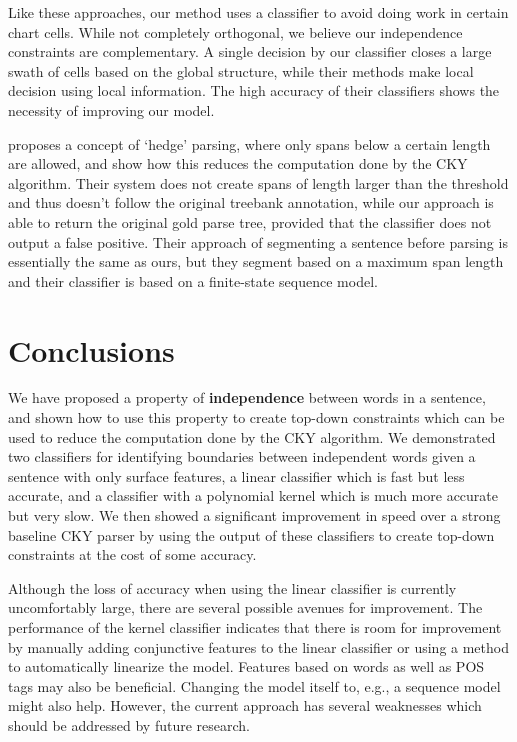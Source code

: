 \documentclass[11pt]{article}
\begin{document}
Like these approaches, our method uses a classifier to avoid doing
work in certain chart cells. While not completely orthogonal, we
believe our independence constraints are complementary. A single
decision by our classifier closes a large swath of cells based on the
global structure, while their methods make local decision using local
information. The high accuracy of their classifiers shows the necessity
of improving our model.

\cite{Yarmohammadi2014} proposes a concept of `hedge' parsing, where only spans
below a certain length are allowed, and show how this reduces the computation
done by the CKY algorithm. Their system does not create spans of length larger
than the threshold and thus doesn't follow the original treebank annotation,
while our approach is able to return the original gold parse tree, provided that
the classifier does not output a false positive. Their approach of segmenting a
sentence before parsing is essentially the same as ours, but they segment based
on a maximum span length and their classifier is based on a finite-state
sequence model.

\section{Conclusions}
\label{sec-7}

We have proposed a property of \textbf{independence} between words in a sentence, and
shown how to use this property to create top-down constraints which can be used
to reduce the computation done by the CKY algorithm. We demonstrated two
classifiers for identifying boundaries between independent words given a
sentence with only surface features, a linear classifier which is fast but less
accurate, and a classifier with a polynomial kernel which is much more accurate
but very slow. We then showed a significant improvement in speed over a strong
baseline CKY parser by using the output of these classifiers to create top-down
constraints at the cost of some accuracy.

Although the loss of accuracy when using the linear classifier is currently
uncomfortably large, there are several possible avenues for improvement. The
performance of the kernel classifier indicates that there is room for
improvement by manually adding conjunctive features to the linear classifier or
using a method to automatically linearize the model. Features based on words as
well as POS tags may also be beneficial. Changing the model itself to, e.g., a
sequence model might also help. However, the current approach has several
weaknesses which should be addressed by future research.
\end{document}
